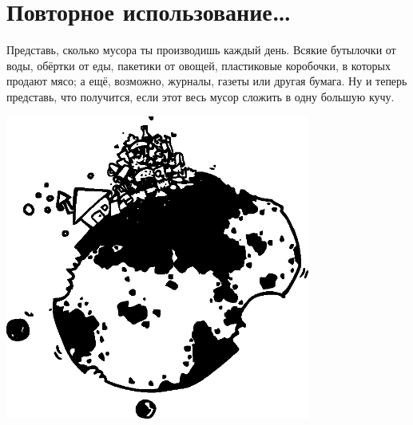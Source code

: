 %
%
%

\chapter{Повторное использование…}\label{ch:sortoflikerecycling}

Представь, сколько мусора ты производишь каждый день. Всякие бутылочки от воды, обёртки от еды, пакетики от овощей, пластиковые коробочки, в которых продают мясо; а ещё, возможно, журналы, газеты или другая бумага. Ну и теперь представь, что получится, если этот весь мусор сложить в одну большую кучу.


\begin{center}
\includegraphics*[width=100mm]{../en/trash.eps}
\end{center}

